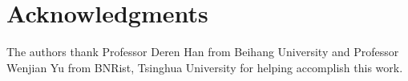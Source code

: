 \section*{Acknowledgments}


The authors thank Professor Deren Han from Beihang University and Professor Wenjian Yu from BNRist, Tsinghua University for helping accomplish this work.
